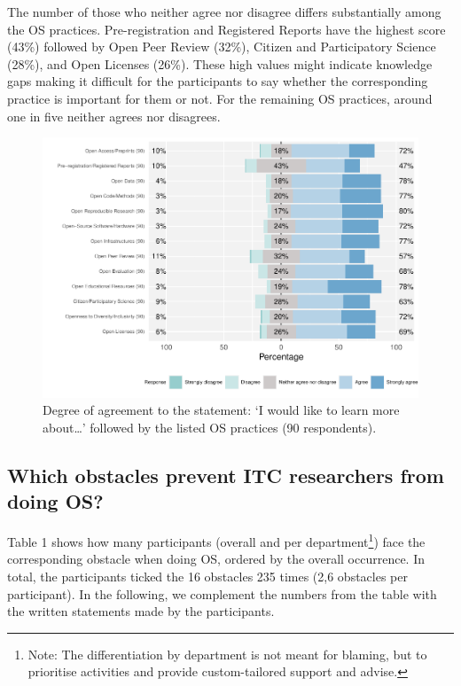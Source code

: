 \documentclass[gc, manuscript]{copernicus}
\begin{document}
The number of those who neither agree nor disagree differs substantially
among the OS practices. Pre-registration and Registered Reports have the
highest score (43\%) followed by Open Peer Review (32\%), Citizen and
Participatory Science (28\%), and Open Licenses (26\%). These high
values might indicate knowledge gaps making it difficult for the
participants to say whether the corresponding practice is important for
them or not. For the remaining OS practices, around one in five neither
agrees nor disagrees.

\begin{figure}
\centering
\includegraphics{questionnaire_files/figure-latex/unnamed-chunk-5-1.pdf}
\caption{Degree of agreement to the statement: `I would like to learn
more about\ldots{}' followed by the listed OS practices (90
respondents).}
\end{figure}

\subsection{Which obstacles prevent ITC researchers from doing OS?}

Table 1 shows how many participants (overall and per
department\footnote{Note: The differentiation by department is not meant
  for blaming, but to prioritise activities and provide custom-tailored
  support and advise.}) face the corresponding obstacle when doing OS,
ordered by the overall occurrence. In total, the participants ticked the
16 obstacles 235 times (2,6 obstacles per participant). In the
following, we complement the numbers from the table with the written
statements made by the participants.
\end{document}
